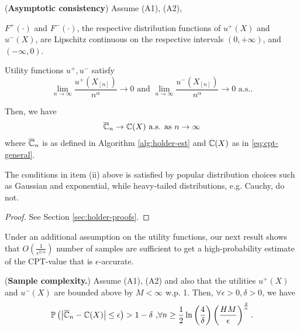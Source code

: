 \begin{proposition}(\textbf{Asymptotic consistency})
\label{prop:holder-asymptotic}
Assume (A1), (A2),\\
\begin{inparaenum}[\bfseries (i)]
\item $F^+(\cdot)$ and $F^-(\cdot)$, the respective distribution functions of $u^+(X)$ and $u^-(X)$, 
are Lipschitz continuous on the respective intervals $(0,+\infty)$, and 
$(-\infty, 0)$. \\
\item Utility functions $u^+, u^-$ satisfy 
$$\lim\limits_{n\rightarrow\infty}\frac{u^+(X_{[n]})}{n^{\alpha}}\rightarrow 0 \text{ and }\lim\limits_{n\rightarrow\infty}\frac{u^-(X_{[n]})}{n^{\alpha}}\rightarrow 0 \text{ a.s.}.$$
\end{inparaenum}
Then, we have 
\begin{align}
\overline {\mathbb{C}}_n
\rightarrow
\mathbb{C}(X)
 \text{   a.s. as } n\rightarrow \infty
\end{align}
where $\overline {\mathbb{C}}_n$ is as defined in Algorithm \ref{alg:holder-est} and $\mathbb{C}(X)$ as in \eqref{eq:cpt-general}.
\end{proposition}
The conditions in item (ii) above is satisfied by popular distribution choices such as Gaussian and exponential, while heavy-tailed distributions, e.g. Cauchy, do not.
\begin{proof}
See Section \ref{sec:holder-proofs}. 
\end{proof}
Under an additional assumption on the utility functions,
our next result shows that $O\left(\frac{1}{\epsilon^{2/\alpha}}\right)$ number of samples are sufficient to get a
high-probability estimate of the CPT-value that is $\epsilon$-accurate.
\begin{proposition}(\textbf{Sample complexity.})
\label{prop:holder-dkw}
Assume (A1), (A2) and also that the utilities $u^+(X)$ and $u^-(X)$ are bounded above by $M<\infty$ w.p. 1. Then, $\forall \epsilon >0, \delta >0$, we have
$$
\mathbb{P}\left( \left |\overline {\mathbb{C}}_n- \mathbb{C}(X) \right| \leq  \epsilon  \right) >1- \delta\text{     ,} \forall n \geq \frac{1}{2}\ln\left(\frac{4}{\delta}\right)
\left(\frac{HM}{\epsilon}\right)^{\frac{2}{\alpha}}.$$
\end{proposition}

